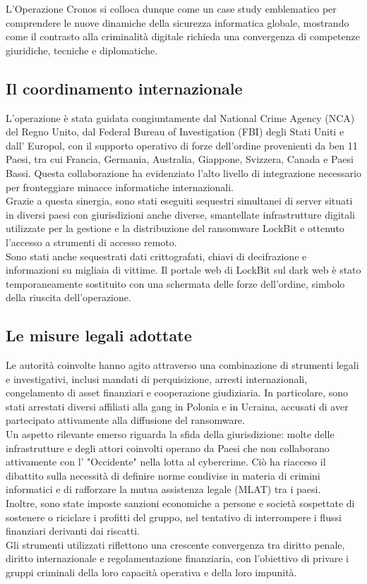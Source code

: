 \documentclass[a4paper,12pt]{article}
\begin{document}
L’Operazione Cronos si colloca dunque come un case study emblematico per comprendere le nuove dinamiche della sicurezza informatica globale, mostrando come il contrasto alla criminalità digitale richieda una convergenza di competenze giuridiche, tecniche e diplomatiche.

\subsection{Il coordinamento internazionale}
L'operazione è stata guidata congiuntamente dal National Crime Agency (NCA) del Regno Unito, dal Federal Bureau of Investigation (FBI) degli Stati Uniti e dall' Europol, con il supporto operativo di forze dell’ordine provenienti da ben 11 Paesi, tra cui Francia, Germania, Australia, Giappone, Svizzera, Canada e Paesi Bassi. Questa collaborazione ha evidenziato l’alto livello di integrazione necessario per fronteggiare minacce informatiche internazionali.\\
Grazie a questa sinergia, sono stati eseguiti sequestri simultanei di server situati in diversi paesi con giurisdizioni anche diverse, smantellate infrastrutture digitali utilizzate per la gestione e la distribuzione del ransomware LockBit e ottenuto l'accesso a strumenti di accesso remoto. \\
Sono stati anche sequestrati dati crittografati, chiavi di decifrazione e informazioni su migliaia di vittime. Il portale web di LockBit sul dark web è stato temporaneamente sostituito con una schermata delle forze dell’ordine, simbolo della riuscita dell’operazione.

\subsection{Le misure legali adottate}
Le autorità coinvolte hanno agito attraverso una combinazione di strumenti legali e investigativi, inclusi mandati di perquisizione, arresti internazionali, congelamento di asset finanziari e cooperazione giudiziaria. In particolare, sono stati arrestati diversi affiliati alla gang in Polonia e in Ucraina, accusati di aver partecipato attivamente alla diffusione del ransomware.\\
Un aspetto rilevante emerso riguarda la sfida della giurisdizione: molte delle infrastrutture e degli attori coinvolti operano da Paesi che non collaborano attivamente con l’ "Occidente" nella lotta al cybercrime. Ciò ha riacceso il dibattito sulla necessità di definire norme condivise in materia di crimini informatici e di rafforzare la mutua assistenza legale (MLAT) tra i paesi.\\
Inoltre, sono state imposte sanzioni economiche a persone e società sospettate di sostenere o riciclare i profitti del gruppo, nel tentativo di interrompere i flussi finanziari derivanti dai riscatti.\\
Gli strumenti utilizzati riflettono una crescente convergenza tra diritto penale, diritto internazionale e regolamentazione finanziaria, con l’obiettivo di privare i gruppi criminali della loro capacità operativa e della loro impunità.
\end{document}

